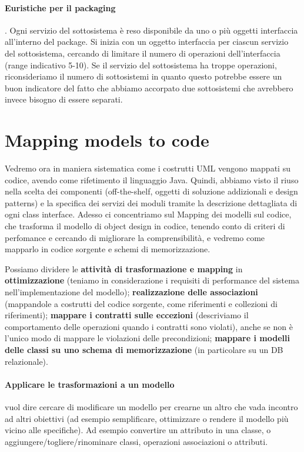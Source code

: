             \paragraph{Euristiche per il packaging}. Ogni servizio del sottosistema è reso disponibile da uno o più oggetti interfaccia all'interno del package. Si inizia con un oggetto interfaccia per ciascun servizio del sottosistema, cercando di limitare il numero di operazioni dell'interfaccia (range indicativo 5-10). Se il servizio del sottosistema ha troppe operazioni, riconsideriamo il numero di sottosistemi in quanto questo potrebbe essere un buon indicatore del fatto che abbiamo accorpato due sottosistemi che avrebbero invece bisogno di essere separati.
            
    \section{Mapping models to code}
        Vedremo ora in maniera sistematica come i costrutti UML vengono mappati su codice, avendo come rifetimento il linguaggio Java. Quindi, abbiamo visto il riuso nella scelta dei componenti (off-the-shelf, oggetti di soluzione addizionali e design patterns) e la specifica dei servizi dei moduli tramite la descrizione dettagliata di ogni class interface. Adesso ci concentriamo sul Mapping dei modelli sul codice, che trasforma il modello di object design in codice, tenendo conto di criteri di perfomance e cercando di migliorare la comprensibilità, e vedremo come mapparlo in codice sorgente e schemi di memorizzazione.
        
        Possiamo dividere le \textbf{attività di trasformazione e mapping} in \textbf{ottimizzazione} (teniamo in considerazione i requisiti di performance del sistema nell'implementazione del modello); \textbf{realizzazione delle associazioni} (mappandole a costrutti del codice sorgente, come riferimenti e collezioni di riferimenti); \textbf{mappare i contratti sulle eccezioni} (descriviamo il comportamento delle operazioni quando i contratti sono violati), anche se non è l'unico modo di mappare le violazioni delle precondizioni; \textbf{mappare i modelli delle classi su uno schema di memorizzazione} (in particolare su un DB relazionale).
        
        \paragraph{Applicare le trasformazioni a un modello} vuol dire cercare di modificare un modello per crearne un altro che vada incontro ad altri obiettivi (ad esempio semplificare, ottimizzare o rendere il modello più vicino alle specifiche). Ad esempio convertire un attributo in una classe, o aggiungere/togliere/rinominare classi, operazioni associazioni o attributi.
        
